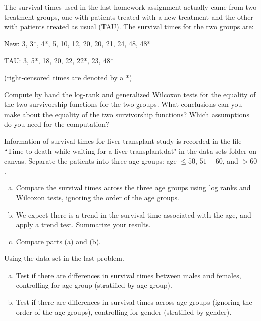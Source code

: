 \documentclass[12pt]{elegantbook}
\begin{document}
    \begin{exercise*}[2]
        The survival times used in the last homework assignment actually came from two treatment groups, one with patients treated with a new treatment and the other with patients treated as usual (TAU). The survival times for the two groups are:

        New: 3, 3*, 4*, 5, 10, 12, 20, 20, 21, 24, 48, 48*
        
        TAU: 3, 5*, 18, 20, 22, 22*, 23, 48*

        (right-censored times are denoted by a *)

        \noindent Compute by hand the log-rank and generalized Wilcoxon tests for the equality of the two survivorship functions for the two groups. What conclusions can you make about the equality of the two survivorship functions? Which assumptions do you need for the computation? 
    \end{exercise*}

    \begin{exercise*}[3]
        Information of survival times for liver transplant study is recorded in the file ``Time to death while waiting for a liver transplant.dat" in the data sets folder on canvas. Separate the patients into three age groups: age $\leq50$, $51-60$, and $> 60$. 
        \begin{enumerate}[(a)]
            \item Compare the survival times across the three age groups using log ranks and Wilcoxon tests, ignoring the order of the age groups. 
            \item We expect there is a trend in the survival time associated with the age, and apply a trend test. Summarize your results.
            \item Compare parts (a) and (b). 
        \end{enumerate}
    \end{exercise*}

    \begin{exercise*}[4]
        Using the data set in the last problem. 
        \begin{enumerate}[(a)]
            \item Test if there are differences in survival times between males and females, controlling for age group (stratified by age group). 
            \item Test if there are differences in survival times across age groups (ignoring the order of the age groups), controlling for gender (stratified by gender).
        \end{enumerate}
    \end{exercise*}
\end{document}
